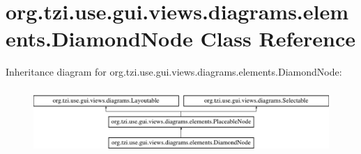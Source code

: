 \hypertarget{classorg_1_1tzi_1_1use_1_1gui_1_1views_1_1diagrams_1_1elements_1_1_diamond_node}{\section{org.\-tzi.\-use.\-gui.\-views.\-diagrams.\-elements.\-Diamond\-Node Class Reference}
\label{classorg_1_1tzi_1_1use_1_1gui_1_1views_1_1diagrams_1_1elements_1_1_diamond_node}
}
Inheritance diagram for org.\-tzi.\-use.\-gui.\-views.\-diagrams.\-elements.\-Diamond\-Node\-:\begin{figure}[H]
\begin{center}
\leavevmode
\includegraphics[height=2.514970cm]{classorg_1_1tzi_1_1use_1_1gui_1_1views_1_1diagrams_1_1elements_1_1_diamond_node}
\end{center}
\end{figure}
